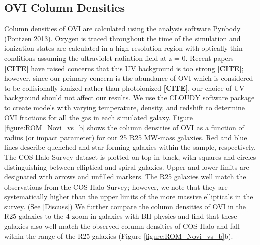 \documentclass[]{emulateapj}
\begin{document}
\subsection{OVI Column Densities}

Column densities of OVI are calculated using the analysis software Pynbody (Pontzen 2013). Oxygen is traced throughout the time of the simulation and  ionization states are calculated in a high resolution region with optically thin conditions assuming the \cite{Haardt2012} ultraviolet radiation field at z = 0. Recent papers \textbf{[CITE]} have raised concerns that this UV background is too strong \textbf{[CITE]}; however, since our primary concern is the abundance of OVI which is considered to be collisionally ionized rather than photoionized \textbf{[CITE]}, our choice of UV background should not affect our results. We use the CLOUDY software package \citep{Ferland1998,Stinson2012} to create models with varying temperature, density, and redshift to determine OVI fractions for all the gas in each simulated galaxy. Figure \ref{figure:ROM_Novi_vs_b} shows the column densities of OVI as a function of radius (or impact parameter) for our 25 R25 MW-mass galaxies. Red and blue lines describe quenched and star forming galaxies within the sample, respectively. The COS-Halo Survey dataset is plotted on top in black, with squares and circles distinguishing between elliptical and spiral galaxies. Upper and lower limits are designated with arrows and unfilled markers. The R25 galaxies well match the observations from the COS-Halo Survey; however, we note that they are systematically higher than the upper limits of the more massive ellipticals in the survey. (See \ref{Discuss}) We further compare the column densities of OVI in the R25 galaxies to the 4 zoom-in galaxies with BH physics and find that these galaxies also well match the observed column densities of COS-Halo and fall within the range of the R25 galaxies (Figure \ref{figure:ROM_Novi_vs_b}b). 
\end{document}
